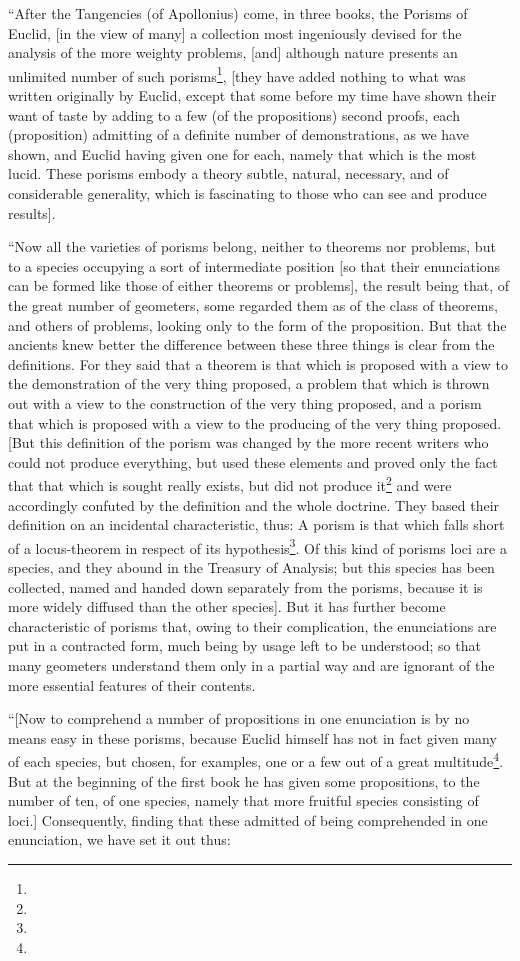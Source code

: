 ``After the Tangencies (of Apollonius) come, in three books, the Porisms of Euclid, [in the view of many] a collection most ingeniously devised for the analysis of the more weighty problems, [and] although nature presents an unlimited number of such porisms\footnote{}, [they have added nothing to what was written originally by Euclid, except that some before my time have shown their want of taste by adding to a few (of the propositions) second proofs, each (proposition) admitting of a definite number of demonstrations, as we have shown, and Euclid having given one for each, namely that which is the most lucid. These porisms embody a theory subtle, natural, necessary, and of considerable generality, which is fascinating to those who can see and produce results].

``Now all the varieties of porisms belong, neither to theorems nor problems, but to a species occupying a sort of intermediate position [so that their enunciations can be formed like those of either theorems or problems], the result being that, of the great number of geometers, some regarded them as of the class of theorems, and others of problems, looking only to the form of the proposition. But that the ancients knew better the difference between these three things is clear from the definitions. For they said that a theorem is that which is proposed with a view to the demonstration of the very thing proposed, a problem that which is thrown out with a view to the construction of the very thing proposed, and a porism that which is proposed with a view to the producing of the very thing proposed. [But this definition of the porism was changed by the more recent writers who could not produce everything, but used these elements and proved only the fact that that which is sought really exists, but did not produce it\footnote{} and were accordingly confuted by the definition and the whole doctrine. They based their definition on an incidental characteristic, thus: A porism is that which falls short of a locus-theorem in respect of its hypothesis\footnote{}. Of this kind of porisms loci are a species, and they abound in the Treasury of Analysis; but this species has been collected, named and handed down separately from the porisms, because it is more widely diffused than the other species]. But it has further become characteristic of porisms that, owing to their complication, the enunciations are put in a contracted form, much being by usage left to be understood; so that many geometers understand them only in a partial way and are ignorant of the more essential features of their contents.

``[Now to comprehend a number of propositions in one enunciation is by no means easy in these porisms, because Euclid himself has not in fact given many of each species, but chosen, for examples, one or a few out of a great multitude\footnote{}. But at the beginning of the first book he has given some propositions, to the number of ten, of one species, namely that more fruitful species consisting of loci.] Consequently, finding that these admitted of being comprehended in one enunciation, we have set it out thus: